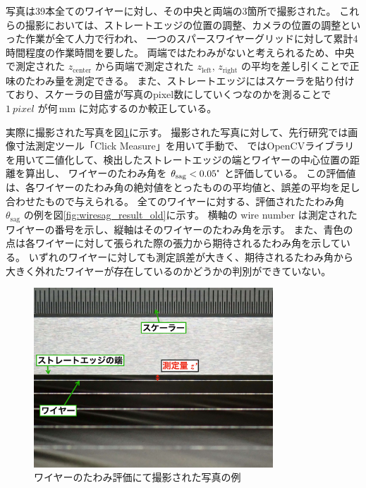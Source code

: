 \documentclass[../../main.tex]{subfiles}
\begin{document}
写真は39本全てのワイヤーに対し、その中央と両端の3箇所で撮影された。
これらの撮影においては、ストレートエッジの位置の調整、カメラの位置の調整といった作業が全て人力で行われ、
一つのスパースワイヤーグリッドに対して累計4時間程度の作業時間を要した。
両端ではたわみがないと考えられるため、中央で測定された $z_{\text{center}}$ から両端で測定された $z_{\text{left}},\,z_{\text{right}}$ の平均を差し引くことで正味のたわみ量を測定できる。
また、ストレートエッジにはスケーラを貼り付けており、スケーラの目盛が写真のpixel数にしていくつなのかを測ることで
$\SI{1}{pixel}$ が何\,$\mathrm{mm}$ に対応するのか較正している。

実際に撮影された写真を図\ref{fig:wiresag_picture_old}に示す。
撮影された写真に対して、先行研究\cite{swg:murata}では画像寸法測定ツール「Click Measure」を用いて手動で、
\cite{swg:iijima}ではOpenCVライブラリを用いて二値化して、検出したストレートエッジの端とワイヤーの中心位置の距離を算出し、
ワイヤーのたわみ角を $\theta_{\mathrm{sag}} < 0.05\tcdegree$ と評価している。
この評価値は、各ワイヤーのたわみ角の絶対値をとったものの平均値と、誤差の平均を足し合わせたもので与えられる。
全てのワイヤーに対する、評価されたたわみ角 $\theta_{\mathrm{sag}}$ の例を図\ref{fig:wiresag_result_old}に示す。
横軸の wire number は測定されたワイヤーの番号を示し、縦軸はそのワイヤーのたわみ角を示す。
また、青色の点は各ワイヤーに対して張られた際の張力から期待されるたわみ角を示している。
いずれのワイヤーに対しても測定誤差が大きく、期待されるたわみ角から大きく外れたワイヤーが存在しているのかどうかの判別ができていない。
\begin{figure}[H]
    \centering
    \includegraphics[width=0.8\textwidth]{wiregrid/wiresag_picture_old.pdf}
    \caption{ワイヤーのたわみ評価にて撮影された写真の例}
    \label{fig:wiresag_picture_old}
\end{figure}
\end{document}
